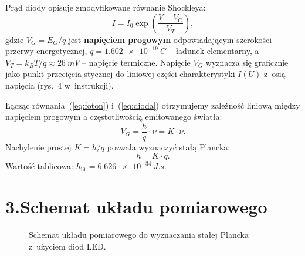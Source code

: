 \documentclass[a4paper,12pt]{article}
\begin{document}
Prąd diody opisuje zmodyfikowane równanie Shockleya:
\begin{equation}
  I = I_0 \exp\!\left(\frac{V - V_G}{V_T}\right),
  \label{eq:dioda}
\end{equation}
gdzie $V_G = E_G / q$ jest \textbf{napięciem progowym} odpowiadającym szerokości przerwy
energetycznej, $q = \SI{1.602e-19}{C}$ – ładunek elementarny, a~$V_T = k_BT/q \approx \SI{26}{mV}$
– napięcie termiczne. Napięcie $V_G$ wyznacza się graficznie jako punkt przecięcia stycznej do
liniowej części charakterystyki $I(U)$ z~osią napięcia (rys.~4 w~instrukcji).

Łącząc równania~(\ref{eq:foton}) i~(\ref{eq:dioda}) otrzymujemy zależność liniową między
napięciem progowym a częstotliwością emitowanego światła:
\begin{equation}
  V_G = \frac{h}{q}\cdot\nu = K\cdot\nu.
  \label{eq:planck_liniowy}
\end{equation}
Nachylenie prostej $K = h/q$ pozwala wyznaczyć stałą Plancka:
\begin{equation}
  h = K \cdot q.
  \label{eq:h}
\end{equation}
Wartość tablicowa: $h_\text{lit} = \SI{6.626e-34}{J.s}$.

\section*{3.\quad Schemat układu pomiarowego}

\begin{figure}[H]
\centering
{}
\caption{Schemat układu pomiarowego do wyznaczania stałej Plancka z~użyciem diod LED.}
\label{fig:schemat}
\end{figure}
\end{document}
